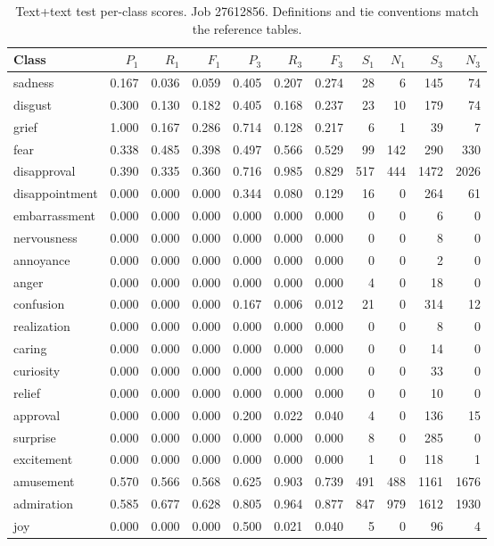 \begin{table}[!htbp]
\centering
\scriptsize
\setlength{\tabcolsep}{5pt}
\begin{tabular}{lrrrrrrrrrr}
\toprule
Class & $P_1$ & $R_1$ & $F_1$ & $P_3$ & $R_3$ & $F_3$ & $S_1$ & $N_1$ & $S_3$ & $N_3$ \\
\midrule
sadness & 0.167 & 0.036 & 0.059 & 0.405 & 0.207 & 0.274 & 28 & 6 & 145 & 74 \\
disgust & 0.300 & 0.130 & 0.182 & 0.405 & 0.168 & 0.237 & 23 & 10 & 179 & 74 \\
grief & 1.000 & 0.167 & 0.286 & 0.714 & 0.128 & 0.217 & 6 & 1 & 39 & 7 \\
fear & 0.338 & 0.485 & 0.398 & 0.497 & 0.566 & 0.529 & 99 & 142 & 290 & 330 \\
disapproval & 0.390 & 0.335 & 0.360 & 0.716 & 0.985 & 0.829 & 517 & 444 & 1472 & 2026 \\
disappointment & 0.000 & 0.000 & 0.000 & 0.344 & 0.080 & 0.129 & 16 & 0 & 264 & 61 \\
embarrassment & 0.000 & 0.000 & 0.000 & 0.000 & 0.000 & 0.000 & 0 & 0 & 6 & 0 \\
nervousness & 0.000 & 0.000 & 0.000 & 0.000 & 0.000 & 0.000 & 0 & 0 & 8 & 0 \\
annoyance & 0.000 & 0.000 & 0.000 & 0.000 & 0.000 & 0.000 & 0 & 0 & 2 & 0 \\
anger & 0.000 & 0.000 & 0.000 & 0.000 & 0.000 & 0.000 & 4 & 0 & 18 & 0 \\
confusion & 0.000 & 0.000 & 0.000 & 0.167 & 0.006 & 0.012 & 21 & 0 & 314 & 12 \\
realization & 0.000 & 0.000 & 0.000 & 0.000 & 0.000 & 0.000 & 0 & 0 & 8 & 0 \\
caring & 0.000 & 0.000 & 0.000 & 0.000 & 0.000 & 0.000 & 0 & 0 & 14 & 0 \\
curiosity & 0.000 & 0.000 & 0.000 & 0.000 & 0.000 & 0.000 & 0 & 0 & 33 & 0 \\
relief & 0.000 & 0.000 & 0.000 & 0.000 & 0.000 & 0.000 & 0 & 0 & 10 & 0 \\
approval & 0.000 & 0.000 & 0.000 & 0.200 & 0.022 & 0.040 & 4 & 0 & 136 & 15 \\
surprise & 0.000 & 0.000 & 0.000 & 0.000 & 0.000 & 0.000 & 8 & 0 & 285 & 0 \\
excitement & 0.000 & 0.000 & 0.000 & 0.000 & 0.000 & 0.000 & 1 & 0 & 118 & 1 \\
amusement & 0.570 & 0.566 & 0.568 & 0.625 & 0.903 & 0.739 & 491 & 488 & 1161 & 1676 \\
admiration & 0.585 & 0.677 & 0.628 & 0.805 & 0.964 & 0.877 & 847 & 979 & 1612 & 1930 \\
joy & 0.000 & 0.000 & 0.000 & 0.500 & 0.021 & 0.040 & 5 & 0 & 96 & 4 \\
\bottomrule
\end{tabular}
\caption{Text+text test per-class scores. Job 27612856. Definitions and tie conventions match the reference tables.}
\label{tab:classes-description_text_control}
\end{table}
